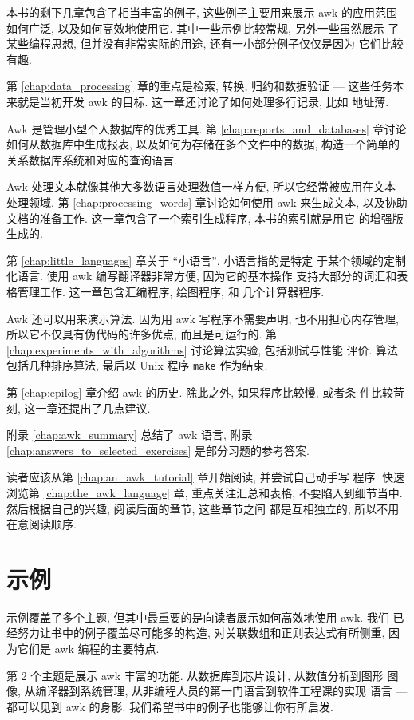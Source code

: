 本书的剩下几章包含了相当丰富的例子, 这些例子主要用来展示 awk 的应用范围
如何广泛, 以及如何高效地使用它. 其中一些示例比较常规, 另外一些虽然展示
了某些编程思想, 但并没有非常实际的用途, 还有一小部分例子仅仅是因为
它们比较有趣.

第 \ref{chap:data_processing} 章的重点是检索, 转换, 归约和数据验证  ---
这些任务本来就是当初开发 awk 的目标. 这一章还讨论了如何处理多行记录, 比如
地址薄.

Awk 是管理小型个人数据库的优秀工具. 第 \ref{chap:reports_and_databases}
章讨论如何从数据库中生成报表, 以及如何为存储在多个文件中的数据, 
构造一个简单的关系数据库系统和对应的查询语言.

Awk 处理文本就像其他大多数语言处理数值一样方便, 所以它经常被应用在文本
处理领域. 第 \ref{chap:processing_words} 章讨论如何使用 awk 来生成文本,
以及协助文档的准备工作. 这一章包含了一个索引生成程序, 本书的索引就是用它
的增强版生成的.

第 \ref{chap:little_languages} 章关于 ``小语言'', 小语言指的是特定
于某个领域的定制化语言. 使用 awk 编写翻译器非常方便, 因为它的基本操作
支持大部分的词汇和表格管理工作. 这一章包含汇编程序, 绘图程序, 和
几个计算器程序.

Awk 还可以用来演示算法. 因为用 awk 写程序不需要声明, 也不用担心内存管理,
所以它不仅具有伪代码的许多优点, 而且是可运行的. 第
\ref{chap:experiments_with_algorithms} 讨论算法实验, 包括测试与性能
评价. 算法包括几种排序算法, 最后以 Unix 程序 \texttt{make} 作为结束.

第 \ref{chap:epilog} 章介绍 awk 的历史. 除此之外, 如果程序比较慢, 或者条
件比较苛刻, 这一章还提出了几点建议.

附录 \ref{chap:awk_summary} 总结了 awk 语言, 附录
\ref{chap:answers_to_selected_exercises} 是部分习题的参考答案.

读者应该从第 \ref{chap:an_awk_tutorial} 章开始阅读, 并尝试自己动手写
程序. 快速浏览第 \ref{chap:the_awk_language} 章, 重点关注汇总和表格,
不要陷入到细节当中. 然后根据自己的兴趣, 阅读后面的章节, 这些章节之间
都是互相独立的, 所以不用在意阅读顺序.
\section*{示例}
示例覆盖了多个主题, 但其中最重要的是向读者展示如何高效地使用 awk. 我们
已经努力让书中的例子覆盖尽可能多的构造, 对关联数组和正则表达式有所侧重,
因为它们是 awk 编程的主要特点.

第 2 个主题是展示 awk 丰富的功能. 从数据库到芯片设计, 从数值分析到图形
图像, 从编译器到系统管理, 从非编程人员的第一门语言到软件工程课的实现
语言 --- 都可以见到 awk 的身影. 我们希望书中的例子也能够让你有所启发.

